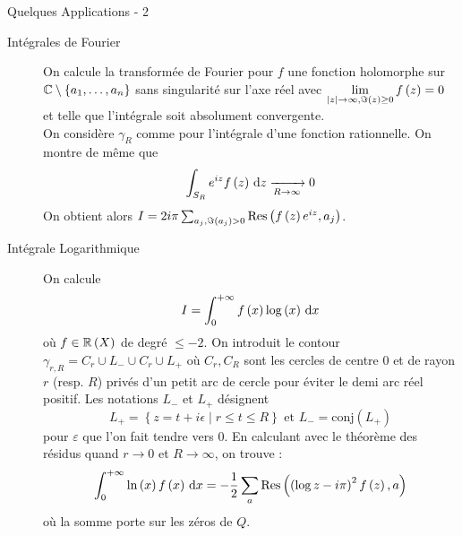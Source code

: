 \documentclass{cours}
\begin{document}
\begin{propositionfr}
	{Quelques Applications - 2}{}
	\begin{description}
		\item[Intégrales de Fourier] On calcule la transformée de Fourier pour $f$ une fonction holomorphe sur $\mathbb{C} \setminus \{a_{1}, \ldots, a_{n}\}$ sans singularité sur l'axe réel avec $\lim\limits_{\left|z\right|\to \infty, \Im\left(z\right) \geq 0} f\left(z\right) = 0$ et telle que l'intégrale soit absolument convergente.\\
			On considère $\gamma_{R}$ comme pour l'intégrale d'une fonction rationnelle.
			On montre de même que 
			\begin{equation*}
				\int_{S_{R}} e^{iz}f\left(z\right){\rm \, d} z \xrightarrow[R \to \infty]{} 0
			\end{equation*}
			On obtient alors $I = 2i\pi \sum_{a_{j}, \Im\left(a_{j}\right) > 0}\mathrm{Res}\left(f\left(z\right)e^{iz}, a_{j}\right)$.
            
		\item[Intégrale Logarithmique] On calcule 
            \begin{equation*}
                I = \int_{0}^{+ \infty} f\left(x\right)\log\left(x\right){\rm \, d} x
            \end{equation*} où $f \in \mathbb{R}\left(X\right)$ de degré $\leq -2$.
			On introduit le contour $\gamma_{r, R} = C_{r} \cup L_{-} \cup C_{r} \cup L_{+}$ où $C_{r}, C_{R}$ sont les cercles de centre $0$ et de rayon $r$ (resp. $R$) privés d'un petit arc de cercle pour éviter le demi arc réel positif.
			Les notations $L_{-}$ et $L_{+}$ désignent 
			\begin{equation*}
				L_{+} = \left\{z = t + i\epsilon \mid r \leq t \leq R \right\} \text{ et } L_{-} = \mathrm{conj}\left(L_{+}\right)
			\end{equation*}
			pour $\varepsilon$ que l'on fait tendre vers $0$. 
			En calculant avec le théorème des résidus quand $r \to 0$ et $R \to \infty$, on trouve :
			\begin{equation*}
				\int_{0}^{+\infty} \ln\left(x\right)f\left(x\right){\rm \, d} x = -\frac{1}{2}\sum_{a}\mathrm{Res}\left(\left(\log z - i\pi\right)^{2}f\left(z\right), a\right)
			\end{equation*}
			où la somme porte sur les zéros de $Q$. 


\end{description}
\end{propositionfr}
\end{document}
